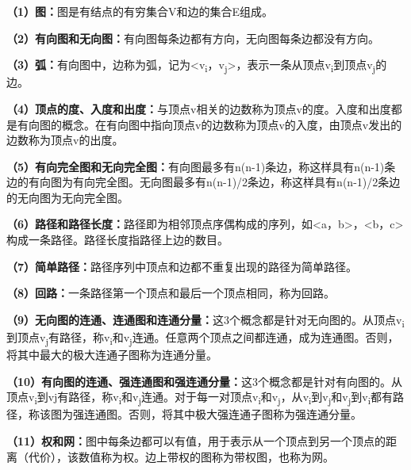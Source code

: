 {\textbf{（1）图：}图是有结点的有穷集合V和边的集合E组成。}

{\textbf{（2）有向图和无向图：}有向图每条边都有方向，无向图每条边都没有方向。}

{\textbf{（3）弧：}有向图中，边称为弧，记为\textless{}v\textsubscript{i}，v\textsubscript{j}\textgreater{}，表示一条从顶点{v}\textsubscript{i}到顶点{v}\textsubscript{j}的边。}

{\textbf{（4）顶点的度、入度和出度：}与顶点v相关的边数称为顶点v的度。入度和出度都是有向图的概念。在有向图中指向顶点v的边数称为顶点v的入度，由顶点v发出的边数称为顶点v的出度。}

{\textbf{（5）有向完全图和无向完全图：}有向图最多有n(n-1)条边，称这样具有n(n-1)条边的有向图为有向完全图。无向图最多有n(n-1)/2条边，称这样具有n(n-1)/2条边的无向图为无向完全图。}

{\textbf{（6）路径和路径长度：}路径即为相邻顶点序偶构成的序列，如\textless{}a，b\textgreater{}，\textless{}b，c\textgreater{}构成一条路径。路径长度指路径上边的数目。}

{\textbf{（7）简单路径：}路径序列中顶点和边都不重复出现的路径为简单路径。}

{\textbf{（8）回路：}一条路径第一个顶点和最后一个顶点相同，称为回路。}

{\textbf{（9）无向图的连通、连通图和连通分量：}这3个概念都是针对无向图的。从顶点{v}\textsubscript{i}到顶点{v}\textsubscript{j}有路径，称{v}\textsubscript{i}和{v}\textsubscript{j}连通。任意两个顶点之间都连通，成为连通图。否则，将其中最大的极大连通子图称为连通分量。}

{\textbf{（10）有向图的连通、强连通图和强连通分量：}这3个概念都是针对有向图的。从顶点{v}\textsubscript{i}到vj有路径，称{v}\textsubscript{i}和{v}\textsubscript{j}连通。对于每一对顶点{v}\textsubscript{i}和{v}\textsubscript{j}，从{v}\textsubscript{i}到{v}\textsubscript{j}和{v}\textsubscript{j}到{v}\textsubscript{i}都有路径，称该图为强连通图。否则，将其中极大强连通子图称为强连通分量。}

{\textbf{（11）权和网：}图中每条边都可以有值，用于表示从一个顶点到另一个顶点的距离（代价），该数值称为权。{边上带权的图称为带权图，也称为网。}}
